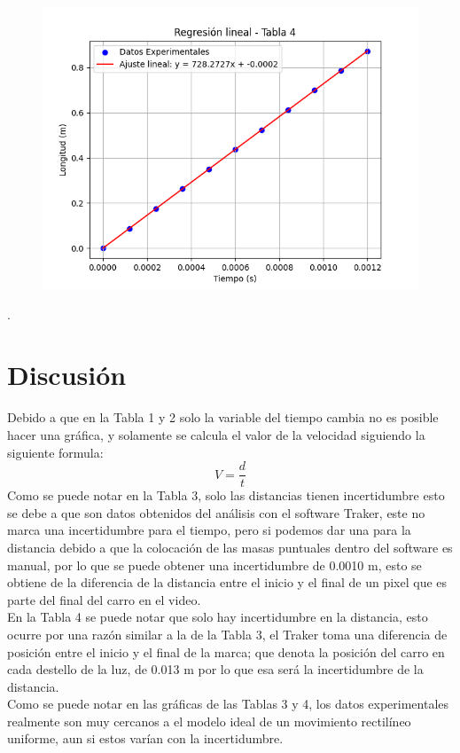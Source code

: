 \documentclass[12pt,a4paper]{article}
\begin{document}
\begin{figure}[h!]
\centering
\includegraphics[scale=0.9]{Figure_4.png}
\end{figure}

\newpage
.

\section{Discusión}

Debido a que en la Tabla 1 y 2 solo la variable del tiempo cambia no es posible hacer una gráfica, y solamente se calcula el valor de la velocidad siguiendo la siguiente formula:
 \[ V = \frac{d}{t}\]
Como se puede notar en la Tabla 3, solo las distancias tienen incertidumbre esto se debe a que son datos obtenidos del análisis con el software Traker, este no marca una incertidumbre para el tiempo, pero si podemos dar una para la distancia debido a que la colocación de las masas puntuales dentro del software es manual, por lo que se puede obtener una incertidumbre de 0.0010 m, esto se obtiene de la diferencia de la distancia entre el inicio y el final de un pixel que es parte del final del carro en el video.\\
En la Tabla 4 se puede notar que solo hay incertidumbre en la distancia, esto ocurre por una razón similar a la de la Tabla 3, el Traker toma una diferencia de posición entre el inicio y el final de la marca; que denota la posición del carro en cada destello de la luz, de 0.013 m por lo que esa será la incertidumbre de la distancia.\\

Como se puede notar en las gráficas de las Tablas 3 y 4, los datos experimentales realmente son muy cercanos a el modelo ideal de un movimiento rectilíneo uniforme, aun si estos varían con la incertidumbre. 
\end{document}

